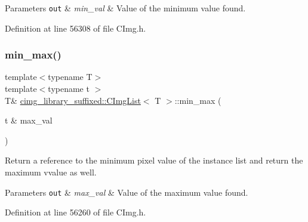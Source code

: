 \begin{DoxyParams}[1]{Parameters}
\mbox{\tt out}  & {\em min\+\_\+val} & Value of the minimum value found. \\
\hline
\end{DoxyParams}


Definition at line 56308 of file C\+Img.\+h.

\mbox{\label{structcimg__library__suffixed_1_1CImgList_ae32eac5622ec6c2b903c63352048708d}} 
\subsubsection{\texorpdfstring{min\+\_\+max()}{min\_max()}\hspace{0.1cm}{\footnotesize\ttfamily [1/2]}}
{\footnotesize\ttfamily template$<$typename T$>$ \\
template$<$typename t $>$ \\
T\& \hyperlink{structcimg__library__suffixed_1_1CImgList}{cimg\+\_\+library\+\_\+suffixed\+::\+C\+Img\+List}$<$ T $>$\+::min\+\_\+max (\begin{DoxyParamCaption}\item[{t \&}]{max\+\_\+val }\end{DoxyParamCaption})\hspace{0.3cm}{\ttfamily [inline]}}



Return a reference to the minimum pixel value of the instance list and return the maximum vvalue as well. 


\begin{DoxyParams}[1]{Parameters}
\mbox{\tt out}  & {\em max\+\_\+val} & Value of the maximum value found. \\
\hline
\end{DoxyParams}


Definition at line 56260 of file C\+Img.\+h.

\mbox{\label{structcimg__library__suffixed_1_1CImgList_a97a9a50eeea12bde9a27e1091dffa358}} 
